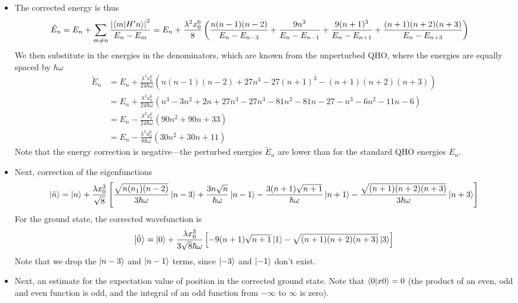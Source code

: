 \documentclass[11pt, a4paper]{article}
\renewcommand{\t}[1]{\tilde{#1}}
\begin{document}
\begin{itemize}
	\item The corrected energy is thus
	\begin{align*}
		\t{E}_{n} &= E_{n} + \sum_{m \neq n} \frac{\abs{\braket{m}{H'n}}^{2}}{E_{n} - E_{m}} = E_{n} + \frac{\lambda^{2} x_{0}^{6}}{8}\left(\frac{n(n-1)(n-2)}{E_{n}-E_{n-3}} + \frac{9n^{3}}{E_{n}-E_{n-1}} + \frac{9(n+1)^{3}}{E_{n} - E_{n+1}} + \frac{(n+1)(n+2)(n+3)}{E_{n} - E_{n+3}} \right)
	\end{align*}
	We then substitute in the energies in the denominators, which are known from the unperturbed QHO, where the energies are equally spaced by $ \hbar \omega $
	\begin{align*}
		\t{E}_{n} &= E_{n} + \frac{\lambda^{2} x_{0}^{6}}{24 \hbar \omega}\left(n(n-1)(n-2) + 27n^{3} - 27(n+1)^{3} - (n+1)(n+2)(n+3) \right)\\
		& = E_{n} + \frac{\lambda^{2} x_{0}^{6}}{24 \hbar \omega} \left(n^{3}-3n^{2} + 2n + 27n^{3} - 27n^{3} - 81n^{2} - 81n - 27 - n^{3} - 6n^{2} - 11n - 6\right)\\
		&=E_{n} - \frac{\lambda^{2} x_{0}^{6}}{24 \hbar \omega} \left(90n^{2} + 90n + 33\right)\\
		&=E_{n} - \frac{\lambda^{2} x_{0}^{6}}{8 \hbar \omega} \left(30n^{2} + 30n + 11\right)
	\end{align*}
	Note that the energy correction is negative---the perturbed energies $ \t{E}_{n} $ are lower than for the standard QHO energies $ E_{n} $.
	
	\item Next, correction of the eigenfunctions
	\begin{equation*}
		\ket{\t{n}} = \ket{n} + \frac{\lambda x_{0}^{3}}{\sqrt{8}}\left[\frac{\sqrt{n(n_1)(n-2)}}{3\hbar \omega}\ket{n-3} + \frac{3n\sqrt{n}}{\hbar \omega}\ket{n-1} - \frac{3(n+1)\sqrt{n+1}}{\hbar \omega}\ket{n+1} - \frac{\sqrt{(n+1)(n+2)(n+3)}}{3\hbar \omega}\ket{n+3}\right]
	\end{equation*}
	For the ground state, the corrected wavefunction is
	\begin{equation*}
		\ket{\t{0}} = \ket{0} + \frac{\lambda x_{0}^{3}}{3\sqrt{8}\hbar\omega}\left[-9(n+1)\sqrt{n+1}\ket{1} - \sqrt{(n+1)(n+2)(n+3)}\ket{3}\right]
	\end{equation*}
	Note that we drop the $ \ket{n-3} $ and $ \ket{n-1} $ terms, since $ \ket{-3} $ and $ \ket{-1} $ don't exist.
	
	\item Next, an estimate for the expectation value of position in the corrected ground state. Note that $ \braket{0}{x0} = 0 $ (the product of an even, odd and even function is odd, and the integral of an odd function from $ -\infty $ to $ \infty $ is zero). 
	

\end{itemize}
\end{document}
